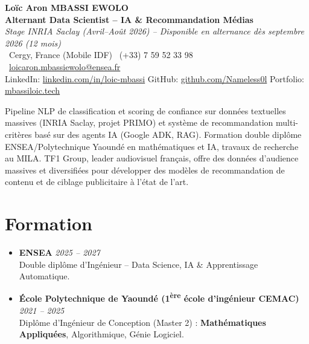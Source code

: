 \documentclass[a4paper,11pt]{article}
\begin{document}
\begin{center}
    {\Large \textbf{Lo\"ic Aron MBASSI EWOLO}} \\ \vspace{4pt}
    \textbf{\large Alternant Data Scientist -- IA \& Recommandation M\'edias} \\
    \textit{\small Stage INRIA Saclay (Avril--Ao\^ut 2026) -- Disponible en alternance d\`es septembre 2026 (12 mois)} \\ \vspace{4pt}
    \small
    \Pointinghand\ Cergy, France (Mobile IDF) \quad \Mobilefone\ (+33) 7 59 52 33 98 \quad
    {\color{primary}\Letter\ \href{mailto:loicaron.mbassiewolo@ensea.fr}{loicaron.mbassiewolo@ensea.fr}} \\ \vspace{2pt}
    {\color{primary}LinkedIn: \href{https://www.linkedin.com/in/loic-mbassi/}{linkedin.com/in/loic-mbassi}} \quad
    {\color{primary}GitHub: \href{https://github.com/Nameless0l}{github.com/Nameless0l}} \quad
    {\color{primary}Portfolio: \href{https://mbassiloic.tech}{mbassiloic.tech}}
\end{center}
\vspace{-6pt}
\noindent\small{Pipeline NLP de classification et scoring de confiance sur donn\'ees textuelles massives (INRIA Saclay, projet PRIMO) et syst\`eme de recommandation multi-crit\`eres bas\'e sur des agents IA (Google ADK, RAG). Formation double dipl\^ome ENSEA/Polytechnique Yaound\'e en math\'ematiques et IA, travaux de recherche au MILA. TF1 Group, leader audiovisuel fran\c{c}ais, offre des donn\'ees d'audience massives et diversifi\'ees pour d\'evelopper des mod\`eles de recommandation de contenu et de ciblage publicitaire \`a l'\'etat de l'art.}

\section{Formation}
\begin{itemize}[leftmargin=*, label=\tiny$\bullet$, nosep]
    \item \textbf{ENSEA} \hfill \textit{2025 -- 2027} \\
    \small{Double dipl\^ome d'Ing\'enieur -- Data Science, IA \& Apprentissage Automatique.}
    \item \textbf{\'Ecole Polytechnique de Yaound\'e (1\textsuperscript{\`ere} \'ecole d'ing\'enieur CEMAC)} \hfill \textit{2021 -- 2025} \\
    \small{Dipl\^ome d'Ing\'enieur de Conception (Master 2) : \textbf{Math\'ematiques Appliqu\'ees}, Algorithmique, G\'enie Logiciel.}
\end{itemize}
\end{document}
